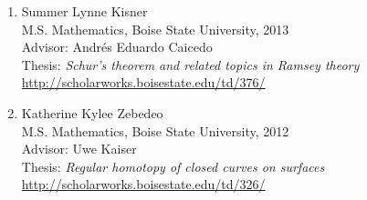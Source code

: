 \documentclass[12pt]{article}
\begin{document}
\begin{enumerate}[revarabic,labelwidth=*]
\item Summer Lynne Kisner \\
M.S. Mathematics, Boise State University, 2013 \\
Advisor: Andr\'es Eduardo Caicedo \\
Thesis: \emph{Schur's theorem and related topics in Ramsey theory} \\
\url{http://scholarworks.boisestate.edu/td/376/}

\item Katherine Kylee Zebedeo \\
M.S. Mathematics, Boise State University, 2012 \\
Advisor: Uwe Kaiser \\
Thesis: \emph{Regular homotopy of closed curves on surfaces} \\
\url{http://scholarworks.boisestate.edu/td/326/}
\end{enumerate}
\end{document}
